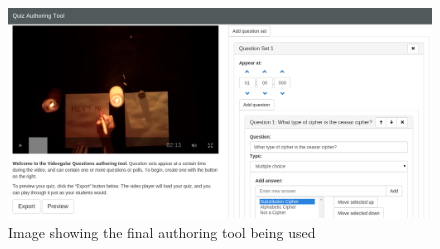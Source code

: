 \begin{landscape}


\begin{figure}[h]
	\centering
		\includegraphics[width=0.8\paperheight]{../figures/authoring_tool_example.png}

	\caption{
		\label{Figure:Authoring_Tool}
		Image showing the final authoring tool being used
	}
\end{figure}

\end{landscape}
